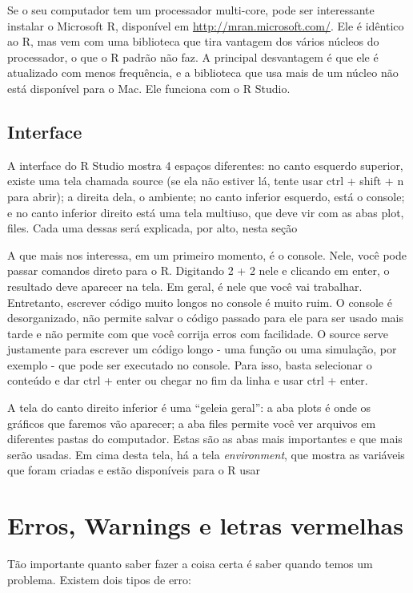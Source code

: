 \documentclass[]{book}
\begin{document}
Se o seu computador tem um processador multi-core, pode ser interessante
instalar o Microsoft R, disponível em \url{http://mran.microsoft.com/}.
Ele é idêntico ao R, mas vem com uma biblioteca que tira vantagem dos
vários núcleos do processador, o que o R padrão não faz. A principal
desvantagem é que ele é atualizado com menos frequência, e a biblioteca
que usa mais de um núcleo não está disponível para o Mac. Ele funciona
com o R Studio.

\subsection{Interface}\label{interface}

A interface do R Studio mostra 4 espaços diferentes: no canto esquerdo
superior, existe uma tela chamada source (se ela não estiver lá, tente
usar ctrl + shift + n para abrir); a direita dela, o ambiente; no canto
inferior esquerdo, está o console; e no canto inferior direito está uma
tela multiuso, que deve vir com as abas plot, files. Cada uma dessas
será explicada, por alto, nesta seção

A que mais nos interessa, em um primeiro momento, é o console. Nele,
você pode passar comandos direto para o R. Digitando 2 + 2 nele e
clicando em enter, o resultado deve aparecer na tela. Em geral, é nele
que você vai trabalhar. Entretanto, escrever código muito longos no
console é muito ruim. O console é desorganizado, não permite salvar o
código passado para ele para ser usado mais tarde e não permite com que
você corrija erros com facilidade. O source serve justamente para
escrever um código longo - uma função ou uma simulação, por exemplo -
que pode ser executado no console. Para isso, basta selecionar o
conteúdo e dar ctrl + enter ou chegar no fim da linha e usar ctrl +
enter.

A tela do canto direito inferior é uma ``geleia geral'': a aba plots é
onde os gráficos que faremos vão aparecer; a aba files permite você ver
arquivos em diferentes pastas do computador. Estas são as abas mais
importantes e que mais serão usadas. Em cima desta tela, há a tela
\emph{environment}, que mostra as variáveis que foram criadas e estão
disponíveis para o R usar

\section{Erros, Warnings e letras
vermelhas}\label{erros-warnings-e-letras-vermelhas}

Tão importante quanto saber fazer a coisa certa é saber quando temos um
problema. Existem dois tipos de erro:
\end{document}
